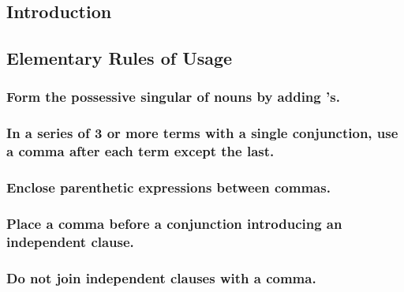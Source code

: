 \documentclass{article}
\begin{document}
\subsection*{Introduction}


\subsection{Elementary Rules of Usage}

\subsubsection{Form the possessive singular of nouns by adding 's.}


\subsubsection{In a series of 3 or more terms with a single conjunction, use a comma after each term except the last.}


\subsubsection{Enclose parenthetic expressions between commas.}


\subsubsection{Place a comma before a conjunction introducing an independent clause.}


\subsubsection{Do not join independent clauses with a comma.}

\end{document}
